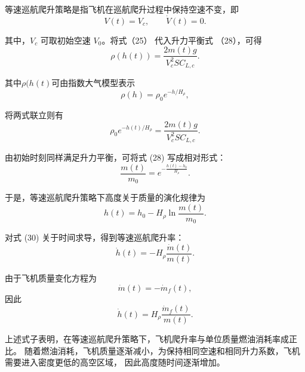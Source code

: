 \documentclass[UTF8]{ctexart}
\begin{document}
等速巡航爬升策略是指飞机在巡航爬升过程中保持空速不变，即
\begin{equation}
    V(t)=V_c,
    \qquad
    \dot V(t)=0.
    \label{eq:constant_speed_condition}
\end{equation}

其中，$V_c$ 可取初始空速 $V_0$。将式（25）
代入升力平衡式 （28），可得
\begin{equation}
    \rho(h(t))
    =
    \frac{2m(t)g}{V_c^2S C_{L,c}}.
    \label{eq:rho_constant_speed}
\end{equation}

其中$\rho(h(t)$可由指数大气模型表示
\begin{equation}
	\rho(h)=\rho_0 e^{-h/H_\rho} ,
    \label{eq:rho_exp_for_climb}
\end{equation}

将两式联立则有
\begin{equation}
    \rho_0 e^{-h(t)/H_\rho} 
    =
    \frac{2m(t)g}{V_c^2S C_{L,c}}.
    \label{eq:constant_speed_h_m}
\end{equation}

由初始时刻同样满足升力平衡，可将式 (28) 写成相对形式：
\begin{equation}
    \frac{m(t)}{m_0}
    = e^{-\frac{h(t)-h_0}{H_\rho}}.
    \label{eq:constant_speed_relative}
\end{equation}

于是，等速巡航爬升策略下高度关于质量的演化规律为
\begin{equation}
    h(t)
    =
    h_0
    -
    H_\rho
    \ln\frac{m(t)}{m_0}.
    \label{eq:constant_speed_h_t}
\end{equation}

对式 (30) 关于时间求导，得到等速巡航爬升率：
\begin{equation}
    \dot h(t)
    =
    -H_\rho\frac{\dot m(t)}{m(t)}.
    \label{eq:constant_speed_h_dot_1}
\end{equation}

由于飞机质量变化方程为
\begin{equation}
    \dot m(t)=-\dot m_f(t),
    \label{eq:m_dot_fuel}
\end{equation}
因此
\begin{equation}
    \dot h(t)
    =
    H_\rho
    \frac{\dot m_f(t)}{m(t)}.
    \label{eq:constant_speed_h_dot}
\end{equation}

上述式子表明，在等速巡航爬升策略下，飞机爬升率与单位质量燃油消耗率成正比。
随着燃油消耗，飞机质量逐渐减小，为保持相同空速和相同升力系数，飞机需要进入密度更低的高空区域，
因此高度随时间逐渐增加。
\end{document}
